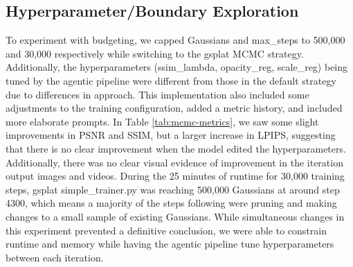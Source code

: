 \subsection{Hyperparameter/Boundary Exploration}
\noindent To experiment with budgeting, we capped Gaussians and max\_steps to 500,000 and 30,000 respectively while switching to the gsplat MCMC strategy. Additionally, the hyperparameters (ssim\_lambda, opacity\_reg, scale\_reg) being tuned by the agentic pipeline were different from those in the default strategy due to differences in approach. This implementation also included some adjustments to the training configuration, added a metric history, and included more elaborate prompts. In Table \ref{tab:mcmc-metrics}, we saw some slight improvements in PSNR and SSIM, but a larger increase in LPIPS, suggesting that there is no clear improvement when the model edited the hyperparameters. Additionally, there was no clear visual evidence of improvement in the iteration output images and videos. During the 25 minutes of runtime for 30,000 training steps, gsplat simple\_trainer.py was reaching 500,000 Gaussians at around step 4300, which means a majority of the steps following were pruning and making changes to a small sample of existing Gaussians. While simultaneous changes in this experiment prevented a definitive conclusion, we were able to constrain runtime and memory while having the agentic pipeline tune hyperparameters between each iteration.\\

\begin{table}[h!]
\centering
\caption{MCMC Training Metrics per Agentic Loop}
\label{tab:mcmc-metrics}
\end{table}


